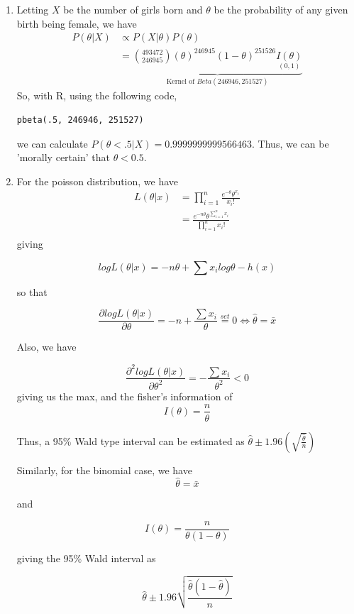 \documentclass[12pt]{article}\usepackage[]{graphicx}\usepackage[]{color}
\begin{document}
\begin{enumerate}
\begin{enumerate}[label = (\alph*)]
\end{enumerate}
\item Letting $X$ be the number of girls born and $\theta$ be the probability of any given birth being female, we have
\begin{align*}
P(\theta | X) & \propto P(X | \theta) P(\theta)\\
& = \underbrace{{493472 \choose 246945} ( \theta)^{246945} ( 1 - \theta)^{251526} \underset{(0,1)}{I(\theta)}}_{\text{Kernel of } Beta(246946, 251527)}
\end{align*}
So, with R, using the following code,
\begin{verbatim}
pbeta(.5, 246946, 251527)
\end{verbatim}
we can calculate $P(\theta < .5 | X) = 0.9999999999566463$. Thus, we can be 'morally certain' that $\theta < 0.5$.


\item 

For the poisson distribution, we have
\begin{align*}
L(\theta | x) &= \prod_{i=1}^n \frac{e^{- \theta} \theta^{x_i}}{x_i !}\\
&=  \frac{e^{- n \theta} \theta^{\sum_{i=1}^n x_i}}{\prod_{i=1}^n x_i !}\\
\end{align*}
giving

 \[ logL( \theta | x) =  - n \theta + \sum x_i log \theta - h(x) \]
 
so that 

\[ \dfrac{\partial log L (\theta | x)}{\partial \theta} = -n + \frac{\sum x_i}{\theta} \overset{set}{=} 0   \Longleftrightarrow \hat{\theta} = \bar{x} \]

Also, we have

\[ \dfrac{\partial^2 log L (\theta | x)}{\partial \theta^2} = - \frac{\sum x_i}{\theta^2} < 0 \]
giving us the max, and the fisher's information of 
\[ I (\theta) =  \frac{n}{\theta}  \]

Thus, a 95\% Wald type interval can be estimated as $\hat{\theta} \pm 1.96 ( \sqrt{\frac{\hat{\theta}}{n}})$

Similarly, for the binomial case, we have
\[ \hat{\theta} = \bar{x} \]

and 

\[ I(\theta) = \frac{n}{\theta ( 1 - \theta)} \]

giving the 95\% Wald interval as 

\[ \hat{\theta} \pm 1.96 \sqrt{\dfrac{\hat{\theta} (1 - \hat{\theta})}{n}} \]


\end{enumerate}
\end{document}
